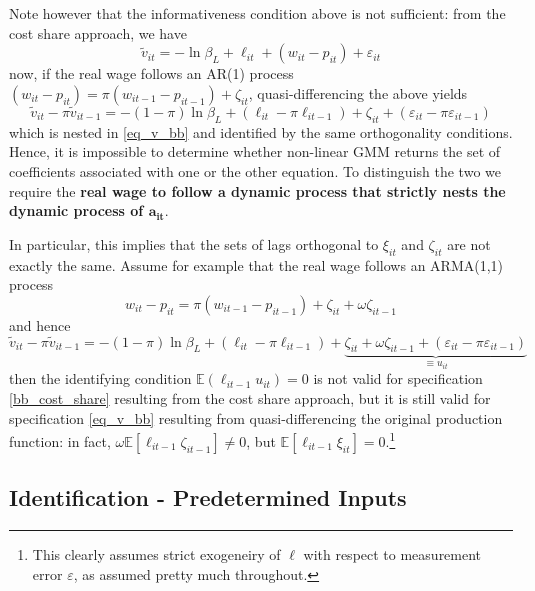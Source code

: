 \documentclass[11pt]{article}
\begin{document}
Note however that the informativeness condition above is not sufficient: from the cost share approach, we have
\begin{equation}
	\label{bb_cost_share}
	\tilde{v}_{it} = - \ln \beta_L + \ell_{it} + (w_{it} - p_{it}) + \varepsilon_{it}
\end{equation}
now, if the real wage follows an AR(1) process $(w_{it} - p_{it}) = \pi(w_{it-1} - p_{it-1}) + \zeta_{it}$, quasi-differencing the above yields
\begin{equation*}
	\tilde{v}_{it} - \pi \tilde{v}_{it-1} = - (1-\pi) \ln \beta_L + (\ell_{it} - \pi \ell_{it-1}) + \zeta_{it} + (\varepsilon_{it}- \pi\varepsilon_{it-1})
\end{equation*}
which is nested in \eqref{eq_v_bb} and identified by the same orthogonality conditions.
Hence, it is impossible to determine whether non-linear GMM returns the set of coefficients associated with one or the other equation.
To distinguish the two we require the \textbf{real wage to follow a dynamic process that strictly nests the dynamic process of $\mathbf{a_{it}}$}.

In particular, this implies that the sets of lags orthogonal to $\xi_{it}$ and $\zeta_{it}$ are not exactly the same. Assume for example that the real wage follows an ARMA(1,1) process
\begin{equation*}
	w_{it} - p_{it} = \pi(w_{it-1} - p_{it-1}) + \zeta_{it} + \omega\zeta_{it-1}
\end{equation*}
and hence
\begin{equation*}
	\tilde{v}_{it} - \pi \tilde{v}_{it-1} = - (1-\pi) \ln \beta_L + (\ell_{it} - \pi \ell_{it-1}) + \underbrace{\zeta_{it} + \omega\zeta_{it-1} + (\varepsilon_{it}- \pi\varepsilon_{it-1})}_{\equiv u_{it}}
\end{equation*}
then the identifying condition $\mathbb{E}(\ell_{it-1}u_{it}) = 0$ is not valid for specification \eqref{bb_cost_share} resulting from the cost share approach, but it is still valid for specification \eqref{eq_v_bb} resulting from quasi-differencing the original production function:
in fact, $\omega\mathbb{E}[\ell_{it-1}\zeta_{it-1}] \neq 0$, but $\mathbb{E}[\ell_{it-1}\xi_{it}] = 0$.\footnote{This clearly assumes strict exogeneiry of $\ell$ with respect to measurement error $\varepsilon$, as assumed pretty much throughout.}

\subsection*{Identification - Predetermined Inputs}
\end{document}

